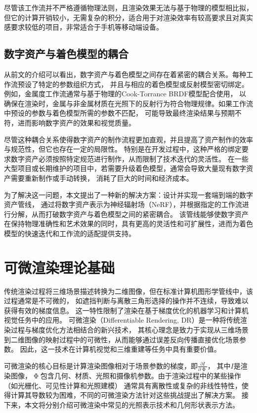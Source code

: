尽管该工作流并不严格遵循物理法则，且渲染效果无法与基于物理的模型相比拟，但它的计算开销较小，无需复杂的积分，适合用于对渲染效率有较高要求且对真实感要求较低的项目，非常适合于手机等移动端设备。

\subsection{数字资产与着色模型的耦合}
从前文的介绍可以看出，数字资产与着色模型之间存在着紧密的耦合关系。每种工作流预设了特定的参数组织方式，
并且与相应的着色模型或反射模型密切绑定。例如，金属度工作流通常与基于物理的Cook-Torrance BRDF模型配合使用，
以确保在渲染时，金属与非金属材质在光照下的反射行为符合物理规律。如果工作流中预设的参数与着色模型所需的参数不匹配，
可能导致最终渲染结果与预期不符，进而影响数字资产的效果和视觉质量。

尽管这种耦合关系使得数字资产的制作流程更加直观，并且提高了资产制作的效率与规范性，但它也存在一定的局限性。
特别是在开发过程中，这种严格的绑定要求数字资产必须按照特定规范进行制作，从而限制了技术迭代的灵活性。
在一些大型项目或长期维护的项目中，若需要升级着色模型，通常会导致大量现有数字资产需要重新制作或手动转换，
消耗了巨大的时间和经济成本。

为了解决这一问题，本文提出了一种新的解决方案：设计并实现一套端到端的数字资产管线，
通过将数字资产表示为神经辐射场（NeRF），并根据指定的工作流进行分解，从而打破数字资产与着色模型之间的紧密耦合。
该管线能够使数字资产在保持物理准确性和艺术效果的同时，具有更高的灵活性和可扩展性，进而为着色模型的快速迭代和工作流的适配提供支持。

\section{可微渲染理论基础}
传统渲染过程将三维场景描述转换为二维图像，但在标准计算机图形学管线中，该过程通常是不可微的，
如遮挡判断与离散三角形选择的操作并不连续，导致难以获得有效的梯度信息。
这一特性限制了渲染在基于梯度优化的机器学习和计算机视觉任务中的应用。
可微渲染（Differentiable Rendering, DR）是一种将传统渲染过程与梯度优化方法相结合的新兴技术，
其核心理念是致力于实现从三维场景到二维图像的映射过程中的可微性，从而能够通过误差反向传播直接优化场景参数。
因此，这一技术在计算机视觉和三维重建等任务中具有重要价值。

可微渲染的核心目标是计算渲染图像相对于场景参数的梯度，即$\tfrac{\partial I}{\partial \upPhi}$，
其中$I$是渲染图像，$\upPhi$包含几何、材质、光照和摄像机参数。由于渲染过程中的某些操作（如光栅化、可见性计算和光照建模）
通常具有离散性或复杂的非线性特性，使得计算其导数较为困难，不同的可微渲染方法针对这些挑战提出了解决方案。
接下来，本文将分别介绍可微渲染中常见的光照表示技术和几何形状表示方法。

